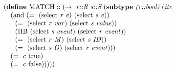 
\begin{equation}
\begin{array}{l}
(\cfgt{define}\ \mathrm{MATCH}::(\rightarrow\ \cfgnt{r::R}\ \cfgnt{s::S}\ (\cfgt{subtype}\ \cfgnt{(c::bool)}\ (\cfgnt{ite} \\
\ \ \ (\mathrm{and}\ (=\ (\mathrm{select}\ \mathit{r}\ \mathit{e})\ (\mathrm{select}\ \mathit{s}\ \mathit{e})) \\
\ \ \ \ \     (=\ (\mathrm{select}\ \mathit{r}\ \mathit{var})\ (\mathrm{select}\ \mathit{s}\ \mathit{value})) \\
\ \ \ \ \    (\mathrm{HB}\ (\mathrm{select}\ \mathit{s}\ \mathit{event})\ (\mathrm{select}\ \mathit{r}\ \mathit{event})) \\
\ \ \ \ \    (=\ (\mathrm{select}\ \mathit{r}\ \mathit{M})\ (\mathrm{select}\ \mathit{s}\ \mathit{ID})) \\
\ \ \ \ \    (=\ (\mathrm{select}\ \mathit{s}\ \mathit{O})\ (\mathrm{select}\ \mathit{r}\ \mathit{event}))) \\
\ \ \  (=\ \mathit{c}\ \mathrm{true}) \\
\ \ \  (=\ \mathit{c}\ \mathrm{false})))))
\end{array}
\label{equation:match}
\end{equation}



